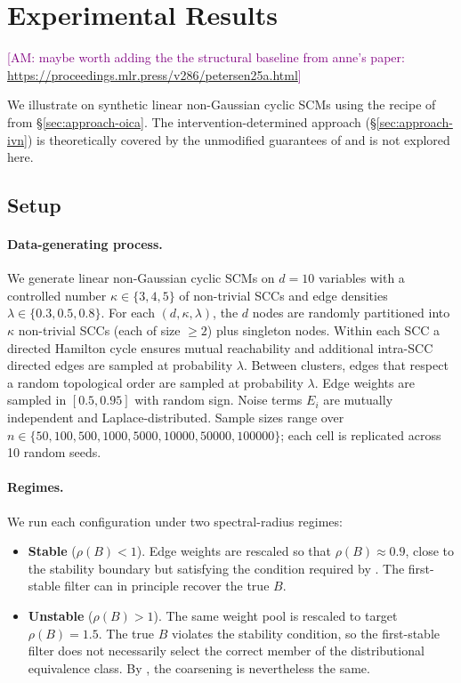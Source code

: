 \documentclass{article}
\newcommand{\alexsays}[1]{\textcolor{purple}{[AM: #1]}}
\begin{document}
\section{Experimental Results}
\label{sec:experiments}

\alexsays{maybe worth adding the the structural baseline from anne's paper: \url{https://proceedings.mlr.press/v286/petersen25a.html}}

We illustrate  on synthetic linear non-Gaussian cyclic SCMs using the recipe of \citet{lacerda2008discovering} from \S\ref{sec:approach-oica}. The intervention-determined approach (\S\ref{sec:approach-ivn}) is theoretically covered by the unmodified guarantees of \citet{madaleno2026coarsening} and is not explored here.

\subsection{Setup}

\paragraph{Data-generating process.} We generate linear non-Gaussian cyclic SCMs on $d = 10$ variables with a controlled number $\kappa \in \{3, 4, 5\}$ of non-trivial SCCs and edge densities $\lambda \in \{0.3, 0.5, 0.8\}$. For each $(d, \kappa, \lambda)$, the $d$ nodes are randomly partitioned into $\kappa$ non-trivial SCCs (each of size $\geq 2$) plus singleton nodes. Within each SCC a directed Hamilton cycle ensures mutual reachability and additional intra-SCC directed edges are sampled at probability $\lambda$. Between clusters, edges that respect a random topological order are sampled at probability $\lambda$. Edge weights are sampled in $[0.5, 0.95]$ with random sign. Noise terms $E_i$ are mutually independent and Laplace-distributed. Sample sizes range over $n \in \{50, 100, 500, 1000, 5000, 10000, 50000, 100000\}$; each cell is replicated across 10 random seeds.

\paragraph{Regimes.} We run each configuration under two spectral-radius regimes:
\begin{itemize}
    \item \textbf{Stable} ($\rho(B) < 1$). Edge weights are rescaled so that $\rho(B) \approx 0.9$, close to the stability boundary but satisfying the condition required by \citet{lacerda2008discovering}. The first-stable filter can in principle recover the true $B$.
    \item \textbf{Unstable} ($\rho(B) > 1$). The same weight pool is rescaled to target $\rho(B) = 1.5$. The true $B$ violates the stability condition, so the first-stable filter does not necessarily select the correct member of the distributional equivalence class. By , the coarsening is nevertheless the same.
\end{itemize}
\end{document}

